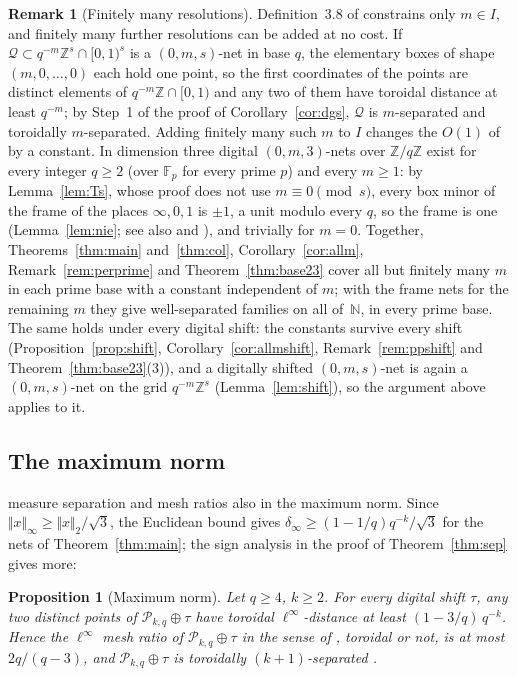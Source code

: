 \documentclass[11pt]{amsart}
\newtheorem{proposition}[theorem]{Proposition}
\theoremstyle{definition}
\newtheorem{remark}[theorem]{Remark}
\theoremstyle{plain}
\newcommand{\Z}{\mathbb{Z}}
\newcommand{\F}{\mathbb{F}}
\providecommand{\N}{\mathbb{N}}
\begin{document}
\begin{remark}[Finitely many resolutions]\label{rem:dgsfinite}
Definition~3.8 of \cite{DGS2} constrains only $m\in I$, and finitely many further resolutions can be added at no cost. If $\mathcal Q\subset q^{-m}\Z^s\cap[0,1)^s$ is a $(0,m,s)$-net in base $q$, the elementary boxes of shape $(m,0,\dots,0)$ each hold one point, so the first coordinates of the points are distinct elements of $q^{-m}\Z\cap[0,1)$ and any two of them have toroidal distance at least $q^{-m}$; by Step~1 of the proof of Corollary~\ref{cor:dgs}, $\mathcal Q$ is $m$-separated and toroidally $m$-separated. Adding finitely many such $m$ to $I$ changes the $O(1)$ of \cite[Def.~3.8]{DGS2} by a constant. In dimension three digital $(0,m,3)$-nets over $\Z/q\Z$ exist for every integer $q\ge2$ (over $\F_p$ for every prime $p$) and every $m\ge1$: by Lemma~\ref{lem:Ts}, whose proof does not use $m\equiv0\pmod s$, every box minor of the frame of the places $\infty,0,1$ is $\pm1$, a unit modulo every $q$, so the frame is one (Lemma~\ref{lem:nie}; see also \cite[Thm.~6.2, Cor.~6.3]{Nie87} and \cite[Sec.~8.2]{DP10}), and trivially for $m=0$. Together, Theorems~\ref{thm:main} and~\ref{thm:col}, Corollary~\ref{cor:allm}, Remark~\ref{rem:perprime} and Theorem~\ref{thm:base23} cover all but finitely many $m$ in each prime base with a constant independent of $m$; with the frame nets for the remaining $m$ they give well-separated families on all of~$\N$, in every prime base. The same holds under every digital shift: the constants survive every shift (Proposition~\ref{prop:shift}, Corollary~\ref{cor:allmshift}, Remark~\ref{rem:ppshift} and Theorem~\ref{thm:base23}(3)), and a digitally shifted $(0,m,s)$-net is again a $(0,m,s)$-net on the grid $q^{-m}\Z^s$ (Lemma~\ref{lem:shift}), so the argument above applies to it.
\end{remark}

\subsection{The maximum norm}
\cite{DGS2} measure separation and mesh ratios also in the maximum norm. Since $\Vert x\Vert_\infty\ge\Vert x\Vert_2/\sqrt3$, the Euclidean bound gives $\delta_\infty\ge(1-1/q)q^{-k}/\sqrt3$ for the nets of Theorem~\ref{thm:main}; the sign analysis in the proof of Theorem~\ref{thm:sep} gives more:

\begin{proposition}[Maximum norm]\label{prop:linf}
Let $q\ge4$, $k\ge2$. For every digital shift $\tau$, any two distinct points of $\mathcal P_{k,q}\oplus\tau$ have toroidal $\ell^\infty$-distance at least $(1-3/q)\,q^{-k}$. Hence the $\ell^\infty$ mesh ratio of $\mathcal P_{k,q}\oplus\tau$ in the sense of \cite{DGS2}, toroidal or not, is at most $2q/(q-3)$, and $\mathcal P_{k,q}\oplus\tau$ is toroidally $(k+1)$-separated \cite[Def.~3.3]{DGS2}.
\end{proposition}
\end{document}
